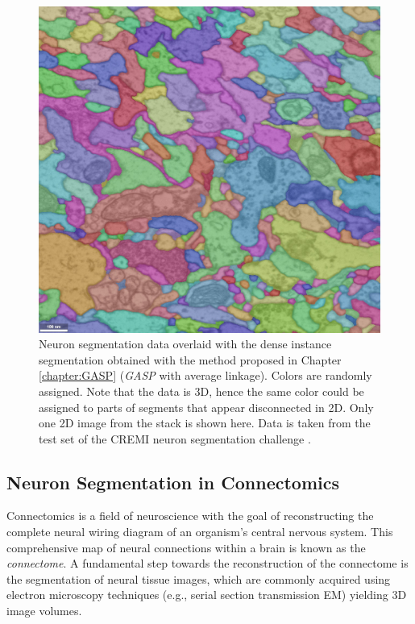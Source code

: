 \begin{figure}[p]
    \centering
    \includegraphics[width=\linewidth,trim=0 0 100 0, clip]{figures/segmentation-cremi.jpg}%
    \caption[Dense segmentation obtained with GASP and average linkage]{
Neuron segmentation data overlaid with the dense instance segmentation obtained with the method proposed in Chapter \ref{chapter:GASP} (\emph{GASP} with average linkage). Colors are randomly assigned. Note that the data is 3D, hence the same color could be assigned to parts of segments that appear disconnected in 2D. Only one 2D image from the stack is shown here. Data is taken from the test set of the CREMI neuron segmentation challenge \cite{cremi}.}
    \label{fig:segmentation_cremi_GASP}
\end{figure}


 
\subsection{Neuron Segmentation in Connectomics}
Connectomics is a field of neuroscience with the goal of reconstructing the complete neural wiring diagram of an organism's central nervous system. This comprehensive map of neural connections within a brain is known as the \emph{connectome}. A fundamental step towards the reconstruction of the connectome is the segmentation of neural tissue images, which are commonly acquired using electron microscopy techniques (e.g., serial section transmission EM) yielding 3D image volumes. 

